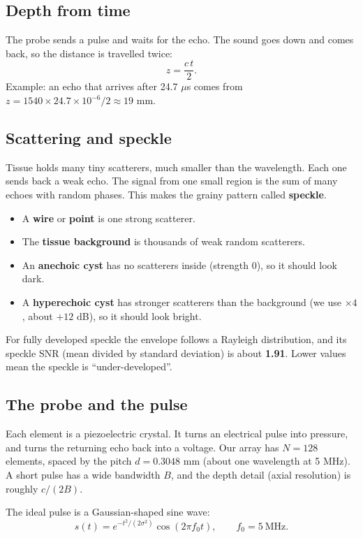 \documentclass[11pt,a4paper]{article}
\begin{document}
\subsection{Depth from time}
The probe sends a pulse and waits for the echo. The sound goes down and comes back, so the distance is travelled twice:
\begin{equation}
z = \frac{c\,t}{2}.
\end{equation}
Example: an echo that arrives after 24.7 $\mu$s comes from $z = 1540\times 24.7\times10^{-6}/2 \approx 19$ mm.

\subsection{Scattering and speckle}
Tissue holds many tiny scatterers, much smaller than the wavelength. Each one sends back a weak echo. The signal from one small region is the sum of many echoes with random phases. This makes the grainy pattern called \textbf{speckle}.
\begin{itemize}
\item A \textbf{wire} or \textbf{point} is one strong scatterer.
\item The \textbf{tissue background} is thousands of weak random scatterers.
\item An \textbf{anechoic cyst} has no scatterers inside (strength 0), so it should look dark.
\item A \textbf{hyperechoic cyst} has stronger scatterers than the background (we use $\times 4$, about $+12$ dB), so it should look bright.
\end{itemize}
For fully developed speckle the envelope follows a Rayleigh distribution, and its speckle SNR (mean divided by standard deviation) is about \textbf{1.91}. Lower values mean the speckle is ``under-developed''.

\subsection{The probe and the pulse}
Each element is a piezoelectric crystal. It turns an electrical pulse into pressure, and turns the returning echo back into a voltage. Our array has $N = 128$ elements, spaced by the pitch $d = 0.3048$ mm (about one wavelength at 5 MHz). A short pulse has a wide bandwidth $B$, and the depth detail (axial resolution) is roughly $c/(2B)$.

The ideal pulse is a Gaussian-shaped sine wave:
\begin{equation}
s(t) = e^{-t^2/(2\sigma^2)}\cos(2\pi f_0 t),\qquad f_0 = 5\ \text{MHz}.
\end{equation}
\end{document}
